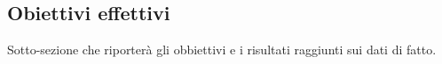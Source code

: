 \subsection{Obiettivi effettivi}

Sotto-sezione che riporterà gli obbiettivi e i risultati raggiunti sui dati di fatto.